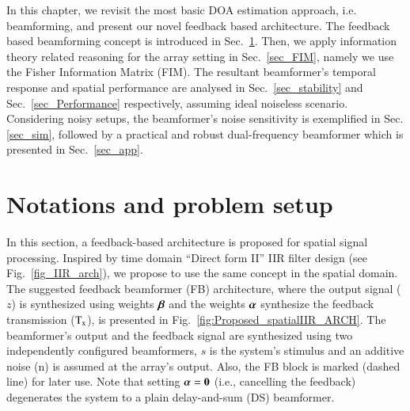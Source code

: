 In this chapter, we revisit the most basic DOA estimation approach, i.e. beamforming, and present our novel feedback based architecture.
The feedback based beamforming concept is introduced in Sec.~\ref{sec_introduceFeedback}.
Then, we apply information theory related reasoning for the array setting in Sec.~\ref{sec_FIM}, namely we use the Fisher Information Matrix (FIM).
The resultant beamformer's temporal response and spatial performance are analysed in Sec.~\ref{sec_stability} and Sec.~\ref{sec_Performance} respectively, assuming ideal noiseless scenario.
Considering noisy setups, the beamformer's noise sensitivity is exemplified in Sec.\ref{sec_sim}, followed by a practical and robust dual-frequency beamformer which is presented in Sec.~\ref{sec_app}.

\section{Notations and problem setup}
\label{sec_introduceFeedback}
In this section, a feedback-based architecture is proposed for spatial signal processing.
Inspired by time domain ``Direct form II'' IIR filter design (see Fig.~\ref{fig_IIR_arch}), 
we propose to use the same concept in the spatial domain.
The suggested feedback beamformer (FB) architecture, where the output signal ($z$) is synthesized using weights $\boldsymbol{\beta}$ and the weights $\boldsymbol{\alpha}$ synthesize the feedback transmission ($\text{T}_{\text{x}}$), is presented in Fig.~\ref{fig:Proposed_spatialIIR_ARCH}. The beamformer's output and the feedback signal are synthesized using two independently configured beamformers, $s$ is the system's stimulus and an additive noise (n) is assumed at the array's output.
Also, the FB block is marked (dashed line) for later use.
Note that setting $\boldsymbol{\alpha}=\boldsymbol{0}$ (i.e., cancelling the feedback) degenerates the system to a plain delay-and-sum (DS) beamformer.
